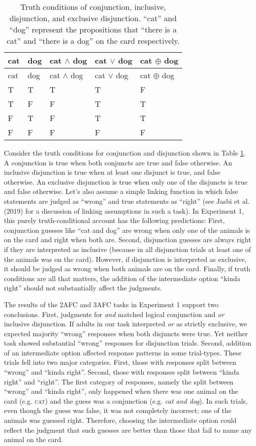 \documentclass[,man,floatsintext]{apa6}
\begin{document}
\begin{longtable}[]{@{}lllll@{}}
\caption{\label{tab:truthtable} Truth conditions of conjunction, inclusive, disjunction, and exclusive disjunction. \enquote{cat} and \enquote{dog} represent the propositions that \enquote{there is a cat} and \enquote{there is a dog} on the card respectively.}\tabularnewline
\toprule
cat & dog & cat \(\land\) dog & cat \(\lor\) dog & cat \(\oplus\) dog\tabularnewline
\midrule
\endfirsthead
\toprule
cat & dog & cat \(\land\) dog & cat \(\lor\) dog & cat \(\oplus\) dog\tabularnewline
\midrule
\endhead
T & T & T & T & F\tabularnewline
T & F & F & T & T\tabularnewline
F & T & F & T & T\tabularnewline
F & F & F & F & F\tabularnewline
\bottomrule
\end{longtable}

Consider the truth conditions for conjunction and disjunction shown in Table \ref{tab:truthtable}. A conjunction is true when both conjuncts are true and false otherwise. An inclusive disjunction is true when at least one disjunct is true, and false otherwise. An exclusive disjunction is true when only one of the disjuncts is true and false otherwise. Let's also assume a simple linking function in which false statements are judged as \enquote{wrong} and true statements as \enquote{right} (see Jasbi et al. (2019) for a discussion of linking assumptions in such a task). In Experiment 1, this purely truth-conditional account has the following predictions: First, conjunction guesses like \enquote{cat and dog} are wrong when only one of the animals is on the card and right when both are. Second, disjunction guesses are always right if they are interpreted as inclusive (because in all disjunction trials at least one of the animals was on the card). However, if disjunction is interpreted as exclusive, it should be judged as wrong when both animals are on the card. Finally, if truth conditions are all that matters, the addition of the intermediate option \enquote{kinda right} should not substantially affect the judgments.

The results of the 2AFC and 3AFC tasks in Experiment 1 support two conclusions. First, judgments for \emph{and} matched logical conjunction and \emph{or} inclusive disjunction. If adults in our task interpreted \emph{or} as strictly exclusive, we expected majority \enquote{wrong} responses when both disjuncts were true. Yet neither task showed substantial \enquote{wrong} responses for disjunction trials. Second, addition of an intermediate option affected response patterns in some trial-types. These trials fell into two major categories. First, those with responses split between \enquote{wrong} and \enquote{kinda right}. Second, those with responses split between \enquote{kinda right} and \enquote{right}. The first category of responses, namely the split between \enquote{wrong} and \enquote{kinda right}, only happened when there was one animal on the card (e.g. \textsc{cat}) and the guess was a conjunction (e.g. \emph{cat and dog}). In such trials, even though the guess was false, it was not completely incorrect; one of the animals was guessed right. Therefore, choosing the intermediate option could reflect the judgment that such guesses are better than those that fail to name any animal on the card.
\end{document}
